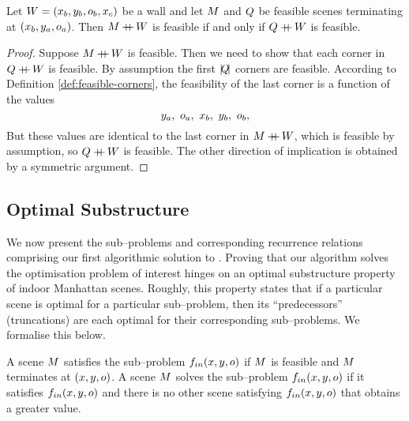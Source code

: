 \begin{lemma}
  \label{lemma:concat-feasibility}
  Let $\Wall=(x_b,y_b,\WallOrient_b,x_c)$ be a wall and let $\Scene$ and
  $\OtherScene$ be feasible scenes terminating at
  $(x_b,y_a,\WallOrient_a)$. Then $\Scene\concat\Wall$ is feasible if
  and only if $\OtherScene\concat\Wall$ is feasible.
\end{lemma}
\begin{proof}
  Suppose $\Scene\concat\Wall$ is feasible. Then we need to show that
  each corner in $\OtherScene\concat\Wall$ is feasible. By assumption
  the first $\Length{\OtherScene}$ corners are feasible. According to
  Definition \ref{def:feasible-corners}, the feasibility of the last corner
  is a function of the values
  \begin{equation}
    y_a,~\WallOrient_a,~x_b,~y_b,~\WallOrient_b,
  \end{equation}
  But these values are identical to the last corner in
  $\Scene\concat\Wall$, which is feasible by assumption, so
  $\OtherScene\concat\Wall$ is feasible. The other
  direction of implication is obtained by a symmetric argument.
\end{proof}

\subsection{Optimal Substructure}

We now present the sub--problems and corresponding recurrence
relations comprising our first algorithmic solution to
. Proving that our algorithm solves the optimisation
problem of interest hinges on an optimal substructure property of
indoor Manhattan scenes. Roughly, this property
states that if a particular scene is optimal for a particular
sub--problem, then its ``predecessors'' (truncations) are each optimal
for their corresponding sub--problems. We formalise this below.

\begin{definition}
  \label{def:sub-problem-in}
  A scene $\Scene$ satisfies the sub--problem
  $\SubProbIN(x,y,\WallOrient)$ if $\Scene$ is feasible and $\Scene$
  terminates at $(x,y,\WallOrient)$.  A scene $\Scene$ solves the
  sub--problem $\SubProbIN(x,y,\WallOrient)$ if it satisfies
  $\SubProbIN(x,y,\WallOrient)$ and there is no other scene satisfying
  $\SubProbIN(x,y,\WallOrient)$ that obtains a greater value.
\end{definition}

